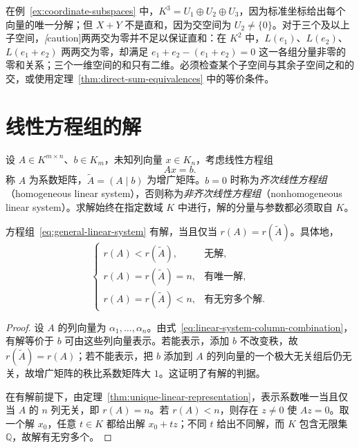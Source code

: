 在例~\ref{ex:coordinate-subspaces} 中，$K^3=U_1\oplus U_2\oplus U_3$，因为标准坐标给出每个向量的唯一分解；但 $X+Y$ 不是直和，因为交空间为 $U_2\ne\{0\}$。对于三个及以上子空间，\emph[caution]{两两交为零并不足以保证直和}：在 $K^2$ 中，$L(e_1)$、$L(e_2)$、$L(e_1+e_2)$ 两两交为零，却满足 $e_1+e_2-(e_1+e_2)=0$ 这一各组分量非零的零和关系；三个一维空间的和只有二维。必须检查某个子空间与其余子空间之和的交，或使用定理~\ref{thm:direct-sum-equivalences} 中的等价条件。

\section{线性方程组的解}
\label{sec:linear-system-solutions}

设 $A\in K^{m\times n}$、$b\in K_m$，未知列向量 $x\in K_n$，考虑线性方程组
\begin{equation}
\label{eq:general-linear-system}
    Ax=b.
\end{equation}
称 $A$ 为系数矩阵，$\widetilde A=(A\mid b)$ 为增广矩阵。$b=0$ 时称为\emph{齐次线性方程组}（homogeneous linear system），否则称为\emph{非齐次线性方程组}（nonhomogeneous linear system）。求解始终在指定数域 $K$ 中进行，解的分量与参数都必须取自 $K$。

\begin{theorem}[解的判定]
\label{thm:linear-system-consistency}
方程组~\eqref{eq:general-linear-system} 有解，当且仅当 $r(A)=r(\widetilde A)$。具体地，
\[
    \begin{cases}
        r(A)<r(\widetilde A),&\text{无解},\\
        r(A)=r(\widetilde A)=n,&\text{有唯一解},\\
        r(A)=r(\widetilde A)<n,&\text{有无穷多个解}.
    \end{cases}
\]
\end{theorem}

\begin{proof}
设 $A$ 的列向量为 $\alpha_1,\ldots,\alpha_n$。由式~\eqref{eq:linear-system-column-combination}，有解等价于 $b$ 可由这些列向量表示。若能表示，添加 $b$ 不改变秩，故 $r(\widetilde A)=r(A)$；若不能表示，把 $b$ 添加到 $A$ 的列向量的一个极大无关组后仍无关，故增广矩阵的秩比系数矩阵大 $1$。这证明了有解的判据。

在有解前提下，由定理~\ref{thm:unique-linear-representation}，表示系数唯一当且仅当 $A$ 的 $n$ 列无关，即 $r(A)=n$。若 $r(A)<n$，则存在 $z\ne0$ 使 $Az=0$。取一个解 $x_0$，任意 $t\in K$ 都给出解 $x_0+tz$；不同 $t$ 给出不同解，而 $K$ 包含无限集 $\mathbb Q$，故解有无穷多个。
\end{proof}

